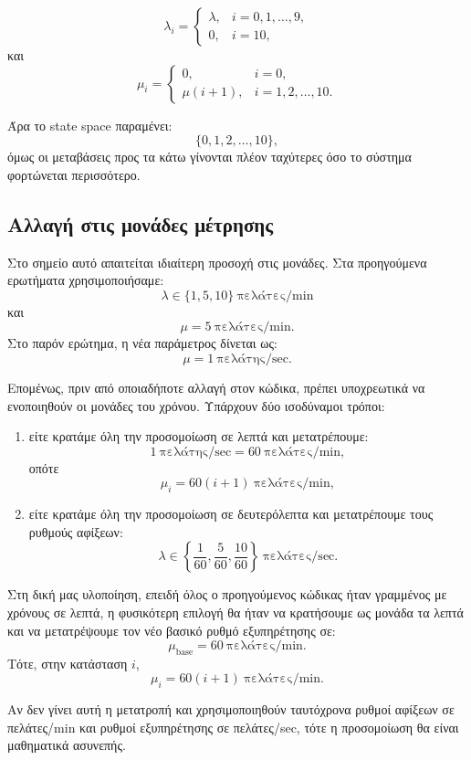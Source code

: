 \documentclass{article}
\begin{document}
\[
\lambda_i =
\begin{cases}
\lambda, & i=0,1,\ldots,9,\\
0, & i=10,
\end{cases}
\]
και
\[
\mu_i =
\begin{cases}
0, & i=0,\\
\mu(i+1), & i=1,2,\ldots,10.
\end{cases}
\]

Άρα το state space παραμένει:
\[
\{0,1,2,\ldots,10\},
\]
όμως οι μεταβάσεις προς τα κάτω γίνονται πλέον ταχύτερες όσο το σύστημα φορτώνεται περισσότερο.

\subsection{Αλλαγή στις μονάδες μέτρησης}

Στο σημείο αυτό απαιτείται ιδιαίτερη προσοχή στις μονάδες. Στα προηγούμενα ερωτήματα χρησιμοποιήσαμε:
\[
\lambda \in \{1,5,10\} \ \text{πελάτες/min}
\]
και
\[
\mu = 5 \ \text{πελάτες/min}.
\]
Στο παρόν ερώτημα, η νέα παράμετρος δίνεται ως:
\[
\mu = 1 \ \text{πελάτης/sec}.
\]

Επομένως, πριν από οποιαδήποτε αλλαγή στον κώδικα, πρέπει υποχρεωτικά να ενοποιηθούν οι μονάδες του χρόνου. Υπάρχουν δύο ισοδύναμοι τρόποι:

\begin{enumerate}[label=\arabic*.]
    \item είτε κρατάμε όλη την προσομοίωση σε λεπτά και μετατρέπουμε:
    \[
    1 \ \text{πελάτης/sec} = 60 \ \text{πελάτες/min},
    \]
    οπότε
    \[
    \mu_i = 60(i+1) \ \text{πελάτες/min},
    \]
    \item είτε κρατάμε όλη την προσομοίωση σε δευτερόλεπτα και μετατρέπουμε τους ρυθμούς αφίξεων:
    \[
    \lambda \in \left\{\frac{1}{60},\frac{5}{60},\frac{10}{60}\right\} \ \text{πελάτες/sec}.
    \]
\end{enumerate}

Στη δική μας υλοποίηση, επειδή όλος ο προηγούμενος κώδικας ήταν γραμμένος με χρόνους σε λεπτά, η φυσικότερη επιλογή θα ήταν να κρατήσουμε ως μονάδα τα λεπτά και να μετατρέψουμε τον νέο βασικό ρυθμό εξυπηρέτησης σε:
\[
\mu_{\text{base}} = 60 \ \text{πελάτες/min}.
\]
Τότε, στην κατάσταση $i$,
\[
\mu_i = 60(i+1) \ \text{πελάτες/min}.
\]

Αν δεν γίνει αυτή η μετατροπή και χρησιμοποιηθούν ταυτόχρονα ρυθμοί αφίξεων σε πελάτες/min και ρυθμοί εξυπηρέτησης σε πελάτες/sec, τότε η προσομοίωση θα είναι μαθηματικά ασυνεπής.
\end{document}
